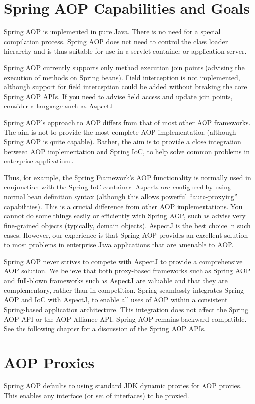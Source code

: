 \section{Spring AOP Capabilities and Goals}
Spring AOP is implemented in pure Java. There is no need for a special compilation process. Spring
AOP does not need to control the class loader hierarchy and is thus suitable for use in a servlet
container or application server.

Spring AOP currently supports only method execution join points (advising the execution of
methods on Spring beans). Field interception is not implemented, although support for field
interception could be added without breaking the core Spring AOP APIs. If you need to advise field
access and update join points, consider a language such as AspectJ.

Spring AOP’s approach to AOP differs from that of most other AOP frameworks. The aim is not to
provide the most complete AOP implementation (although Spring AOP is quite capable). Rather, the
aim is to provide a close integration between AOP implementation and Spring IoC, to help solve
common problems in enterprise applications.

Thus, for example, the Spring Framework’s AOP functionality is normally used in conjunction with
the Spring IoC container. Aspects are configured by using normal bean definition syntax (although
this allows powerful “auto-proxying” capabilities). This is a crucial difference from other AOP
implementations. You cannot do some things easily or efficiently with Spring AOP, such as advise
very fine-grained objects (typically, domain objects). AspectJ is the best choice in such cases.
However, our experience is that Spring AOP provides an excellent solution to most problems in
enterprise Java applications that are amenable to AOP.

Spring AOP never strives to compete with AspectJ to provide a comprehensive AOP solution. We
believe that both proxy-based frameworks such as Spring AOP and full-blown frameworks such as
AspectJ are valuable and that they are complementary, rather than in competition. Spring
seamlessly integrates Spring AOP and IoC with AspectJ, to enable all uses of AOP within a consistent
Spring-based application architecture. This integration does not affect the Spring AOP API or the
AOP Alliance API. Spring AOP remains backward-compatible. See the following chapter for a
discussion of the Spring AOP APIs.

\section{AOP Proxies}
Spring AOP defaults to using standard JDK dynamic proxies for AOP proxies. This enables any
interface (or set of interfaces) to be proxied.

